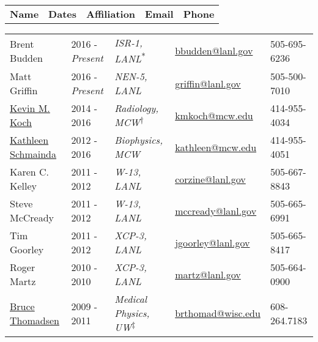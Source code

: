 
\normalsize


\begin{center}
\begin{minipage}{\textwidth}
\begin{tabular}{p{3.2cm}p{2.2cm}p{3.3cm}p{5.0cm}p{2.4cm}}
\textbf{Name} & \textbf{Dates}  & \textbf{Affiliation} & \textbf{Email} & \textbf{Phone} \\
\end{tabular}
\end{minipage}
\end{center}


\begin{center}
\begin{minipage}{\textwidth}
\begin{tabular}{p{3.2cm}p{2.2cm}p{3.3cm}p{5.0cm}p{2.4cm}}
Brent Budden & 2016 - \emph{Present} & \textit{ISR-1, LANL}\textsuperscript{*} &  \href{mailto:bbudden@lanl.gov}{bbudden@lanl.gov} & 505-695-6236 \\
Matt Griffin & 2016 - \emph{Present} & \textit{NEN-5, LANL}                    &  \href{mailto:griffin@lanl.gov}{griffin@lanl.gov} & 505-500-7010 \\
\href{http://www.mcw.edu/radiology/faculty/Kevin-Koch-PhD.htm}{Kevin M. Koch} & 2014 - 2016 & \textit{Radiology, MCW}\textsuperscript{$\dagger$} & \href{mailto:kmkoch@mcw.edu}{kmkoch@mcw.edu} & 414-955-4034 \\
\href{http://www.mcw.edu/radiology/faculty/Kathleen-Schmainda-PhD.htm}{Kathleen Schmainda} & 2012 - 2016 & \textit{Biophysics, MCW}  & \href{mailto:kathleen@mcw.edu}{kathleen@mcw.edu} &  414-955-4051 \\
Karen C. Kelley & 2011 - 2012 & \textit{W-13, LANL} & \href{mailto:corzine@lanl.gov}{corzine@lanl.gov} & 505-667-8843 \\
Steve McCready & 2011 - 2012 &\textit{W-13, LANL} & \href{mailto:mccready@lanl.gov}{mccready@lanl.gov} & 505-665-6991 \\
Tim Goorley & 2011 - 2012 & \textit{XCP-3, LANL} &\href{mailto:jgoorley@lanl.gov}{jgoorley@lanl.gov} & 505-665-8417 \\
Roger Martz & 2010 - 2010 & \textit{XCP-3, LANL} & \href{mailto:martz@lanl.gov}{martz@lanl.gov} &  505-664-0900 \\
{\href{https://www.medphysics.wisc.edu/directory/thomadsen.php}{Bruce Thomadsen}} \label{bruce_thomadsen}& 2009 - 2011 & \textit{Medical Physics, UW}\textsuperscript{$\ddagger$} & \href{mailto:brthomad@wisc.edu}{brthomad@wisc.edu} &  608-264.7183 \\

\end{tabular}
\end{minipage}
\end{center}

